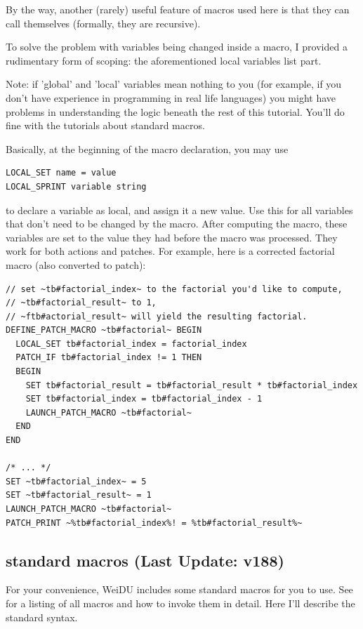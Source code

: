 \documentclass{article}
\begin{document}
By the way, another (rarely) useful feature of macros used here is that they
can call themselves (formally, they are recursive).

To solve the problem with variables being changed inside a macro, I provided
a rudimentary form of scoping: the aforementioned local variables list part.

Note: if 'global' and 'local' variables mean nothing to you (for example, if you
don't have experience in programming in real life languages) you might have
problems in understanding the logic beneath the rest of this tutorial. You'll do
fine with the tutorials about standard macros.

Basically, at the beginning of the macro declaration, you may use
\begin{verbatim}
LOCAL_SET name = value
LOCAL_SPRINT variable string
\end{verbatim}
to declare a variable as local, and assign it a new value. Use this for all variables
that don't need to be changed by the macro. After computing the macro, these variables
are set to the value they had before the macro was processed. They work for both
actions and patches. For example, here is a corrected
factorial macro (also converted to patch):
\begin{verbatim}
// set ~tb#factorial_index~ to the factorial you'd like to compute,
// ~tb#factorial_result~ to 1,
// ~ftb#actorial_result~ will yield the resulting factorial.
DEFINE_PATCH_MACRO ~tb#factorial~ BEGIN
  LOCAL_SET tb#factorial_index = factorial_index
  PATCH_IF tb#factorial_index != 1 THEN
  BEGIN
    SET tb#factorial_result = tb#factorial_result * tb#factorial_index
    SET tb#factorial_index = tb#factorial_index - 1
    LAUNCH_PATCH_MACRO ~tb#factorial~
  END
END

/* ... */
SET ~tb#factorial_index~ = 5
SET ~tb#factorial_result~ = 1
LAUNCH_PATCH_MACRO ~tb#factorial~
PATCH_PRINT ~%tb#factorial_index%! = %tb#factorial_result%~
\end{verbatim}

\subsection{standard macros (Last Update: v188)}

For your convenience, WeiDU includes some standard macros for you to use.
See  for a listing of all macros and how to invoke
them in detail. Here I'll describe the standard syntax.
\end{document}
